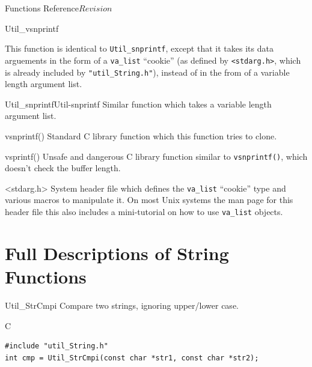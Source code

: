 \begin{cactuspart}{ Functions Reference}{}{$Revision$}
\begin{FunctionDescription}{Util\_vsnprintf}
\begin{Discussion}
This function is identical to \verb|Util_snprintf|, except that it
takes its data arguements in the form of a \verb|va_list| ``cookie''
(as defined by \verb|<stdarg.h>|, which is already included by
\verb|"util_String.h"|), instead of in the from of a variable length
argument list.
\end{Discussion}

\begin{SeeAlsoSection}
\begin{SeeAlso2}{Util\_snprintf}{Util-snprintf}
Similar function which takes a variable length argument list.
\end{SeeAlso2}
\begin{SeeAlso}{vsnprintf()}
Standard C library function which this function tries to clone.
\end{SeeAlso}
\begin{SeeAlso}{vsprintf()}
Unsafe and dangerous C library function similar to \verb|vsnprintf()|,
which doesn't check the buffer length.
\end{SeeAlso}
\begin{SeeAlso}{<stdarg.h>}
System header file which defines the \verb|va_list| ``cookie'' type
and various macros to manipulate it.  On most Unix systems the man
page for this header file this also includes a mini-tutorial on how
to use \verb|va_list| objects.
\end{SeeAlso}
\end{SeeAlsoSection}
\end{FunctionDescription}


\chapter{Full Descriptions of String Functions}


\begin{FunctionDescription}{Util\_StrCmpi}
\label{Util-StrCmpi}
Compare two strings, ignoring upper/lower case.

\begin{SynopsisSection}
\begin{Synopsis}{C}
\begin{verbatim}
#include "util_String.h"
int cmp = Util_StrCmpi(const char *str1, const char *str2);
\end{verbatim}
\end{Synopsis}
\end{SynopsisSection}


\end{FunctionDescription}
\end{cactuspart}
